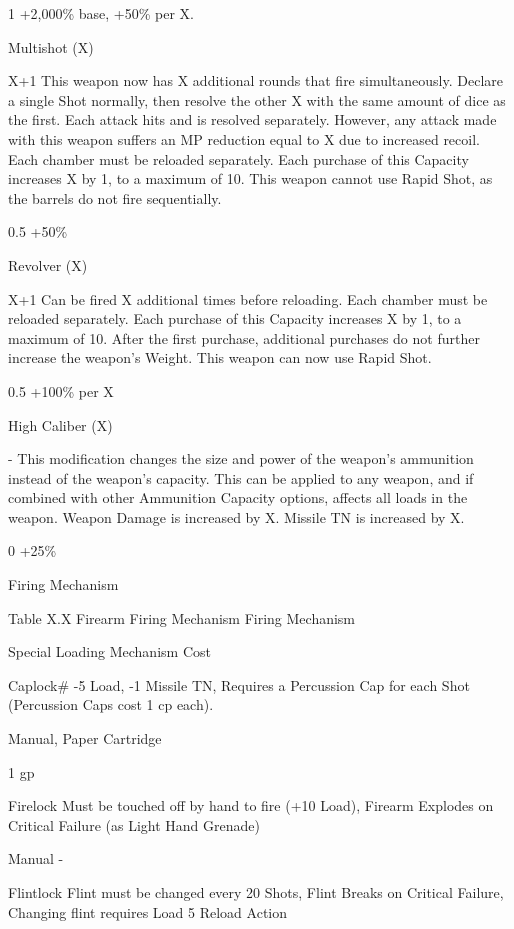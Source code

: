 \documentclass[oneside,11pt,english]{book}
\begin{document}
 

1 +2,000\% 
base, +50\% 
per X. 

Multishot 
(X) 

X+1 This weapon now has X additional rounds that fire simultaneously. Declare a single 
Shot normally, then resolve the other X with the same amount of dice as the first. 
Each attack hits and is resolved separately. However, any attack made with this 
weapon suffers an MP reduction equal to X due to increased recoil. Each chamber 
must be reloaded separately. Each purchase of this Capacity increases X by 1, to a 
maximum of 10. 
This weapon cannot use Rapid Shot, as the barrels do not fire sequentially. 

0.5 +50\% 

Revolver 
(X) 

X+1 Can be fired X additional times before reloading. Each chamber must be reloaded 
separately. Each purchase of this Capacity increases X by 1, to a maximum of 10. 
After the first purchase, additional purchases do not further increase the weapon’s 
Weight. 
This weapon can now use Rapid Shot. 

0.5 +100\% per 
X 

High 
Caliber 
(X) 

- This modification changes the size and power of the weapon’s ammunition instead of 
the weapon’s capacity. This can be applied to any weapon, and if combined with 
other Ammunition Capacity options, affects all loads in the weapon. 
Weapon Damage is increased by X. Missile TN is increased by X. 

0 +25\% 


 
Firing Mechanism 

 
Table X.X Firearm Firing Mechanism 
Firing 
Mechanism 

Special Loading Mechanism Cost 

Caplock\# -5 Load, -1 Missile TN, Requires a Percussion Cap for each Shot (Percussion 
Caps cost 1 cp each). 

Manual, Paper 
Cartridge 

1 gp 

Firelock Must be touched off by hand to fire (+10 Load), Firearm Explodes on Critical 
Failure (as Light Hand Grenade) 

Manual - 

Flintlock Flint must be changed every 20 Shots, Flint Breaks on Critical Failure, 
Changing flint requires Load 5 Reload Action 
\end{document}
